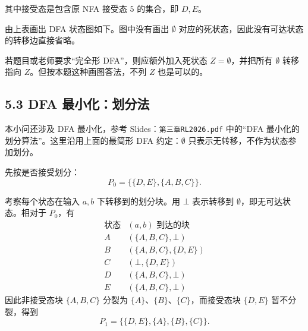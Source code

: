 \documentclass[UTF8,zihao=-4]{ctexart}
\newcommand{\kw}[1]{\texttt{#1}}
\begin{document}
其中接受态是包含原 NFA 接受态 $5$ 的集合，即 $D,E$。

由上表画出 DFA 状态图如下。图中没有画出 $\emptyset$ 对应的死状态，因此没有可达状态的转移边直接省略。

\begin{center}
\end{center}

若题目或老师要求“完全形 DFA”，则应额外加入死状态 $Z=\emptyset$，并把所有 $\emptyset$ 转移指向 $Z$。但按本题这种画图答法，不列 $Z$ 也是可以的。

\subsection*{5.3 DFA 最小化：划分法}

本小问还涉及 DFA 最小化，参考 Slides：\kw{第三章RL2026.pdf} 中的“DFA 最小化的划分算法”。这里沿用上面的最简形 DFA 约定：$\emptyset$ 只表示无转移，不作为状态参加划分。

先按是否接受划分：
\[
P_0=\bigl\{\{D,E\},\{A,B,C\}\bigr\}.
\]

考察每个状态在输入 $a,b$ 下转移到的划分块。用 $\bot$ 表示转移到 $\emptyset$，即无可达状态。相对于 $P_0$，有
\[
\begin{array}{c|c}
\text{状态} & (a,b)\text{ 到达的块}\\
\hline
A & (\{A,B,C\},\bot)\\
B & (\{A,B,C\},\{D,E\})\\
C & (\bot,\{D,E\})\\
D & (\{A,B,C\},\bot)\\
E & (\{A,B,C\},\bot)
\end{array}
\]
因此非接受态块 $\{A,B,C\}$ 分裂为 $\{A\}$、$\{B\}$、$\{C\}$，而接受态块 $\{D,E\}$ 暂不分裂，得到
\[
P_1=\bigl\{\{D,E\},\{A\},\{B\},\{C\}\bigr\}.
\]
\end{document}
